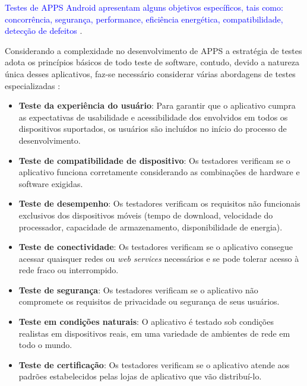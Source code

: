 \textcolor{blue}{Testes de \ac{APPS} Android apresentam alguns objetivos específicos, tais como: concorrência, segurança, performance, eficiência energética, compatibilidade, detecção de defeitos} \cite{8453877}.

Considerando a complexidade no desenvolvimento de \ac{APPS} a estratégia de testes adota os princípios básicos de todo teste de software, contudo, devido a natureza única desses aplicativos, faz-se necessário considerar várias abordagens de testes especializadas \cite{PRESSMAN2016}:


\begin{itemize}

    \item \textbf{Teste da experiência do usuário}: Para garantir que o aplicativo cumpra as expectativas de usabilidade e acessibilidade dos envolvidos em todos os dispositivos suportados, os usuários são incluídos no início do processo de desenvolvimento.
    
    \item \textbf{Teste de compatibilidade de dispositivo}: Os testadores verificam se o aplicativo funciona corretamente considerando as combinações de hardware e software exigidas.
    
    \item \textbf{Teste de desempenho}: Os testadores verificam os requisitos não funcionais exclusivos dos dispositivos móveis (tempo de download, velocidade do processador, capacidade de armazenamento, disponibilidade de energia).
    
    \item \textbf{Teste de conectividade}: Os testadores verificam se o aplicativo consegue acessar quaisquer redes ou \textit{web services} necessários e se pode tolerar acesso à rede fraco ou interrompido.
    
    \item \textbf{Teste de segurança}: Os testadores verificam se o aplicativo não compromete os requisitos de privacidade ou segurança de seus usuários.
    
    \item \textbf{Teste em condições naturais}: O aplicativo é testado sob condições realistas em dispositivos reais, em uma variedade de ambientes de rede em todo o mundo.
    
    \item \textbf{Teste de certificação}: Os testadores verificam se o aplicativo atende aos padrões estabelecidos pelas lojas de aplicativo que vão distribuí-lo.

\end{itemize}


